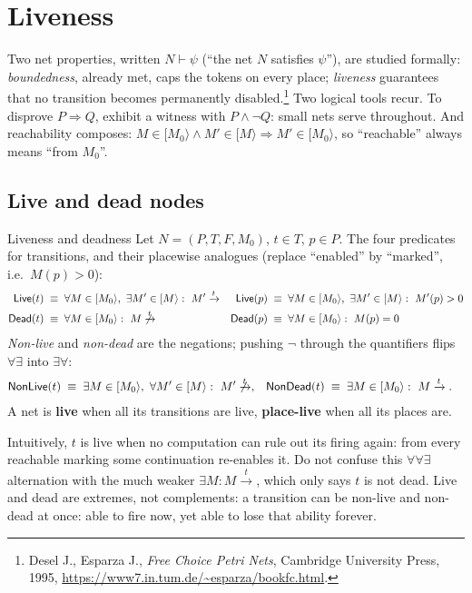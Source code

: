 \section{Liveness}

Two net properties, written $N \vdash \psi$ (``the net $N$ satisfies $\psi$''), are studied formally: \emph{boundedness}, already met, caps the tokens on every place; \emph{liveness} guarantees that no transition becomes permanently disabled.\footnote{Desel J., Esparza J., \emph{Free Choice Petri Nets}, Cambridge University Press, 1995, \url{https://www7.in.tum.de/~esparza/bookfc.html}.} Two logical tools recur. To disprove $P \Rightarrow Q$, exhibit a witness with $P \wedge \neg Q$: small nets serve throughout. And reachability composes: $M \in [M_0\rangle \wedge M' \in [M\rangle \Rightarrow M' \in [M_0\rangle$, so ``reachable'' always means ``from $M_0$''.

\subsection{Live and dead nodes}

\begin{definitionbox}{Liveness and deadness}
Let $N = (P, T, F, M_0)$, $t \in T$, $p \in P$. The four predicates for transitions, and their placewise analogues (replace ``enabled'' by ``marked'', i.e.\ $M(p) > 0$):
\begin{align*}
  \mathsf{Live}(t) &\;\equiv\; \forall M \in [M_0\rangle,\ \exists M' \in [M\rangle :\ M' \xrightarrow{t}
  & \mathsf{Live}(p) &\;\equiv\; \forall M \in [M_0\rangle,\ \exists M' \in [M\rangle :\ M'(p) > 0 \\
  \mathsf{Dead}(t) &\;\equiv\; \forall M \in [M_0\rangle :\ M \not\xrightarrow{t}
  & \mathsf{Dead}(p) &\;\equiv\; \forall M \in [M_0\rangle :\ M(p) = 0
\end{align*}
\emph{Non-live} and \emph{non-dead} are the negations; pushing $\neg$ through the quantifiers flips $\forall\exists$ into $\exists\forall$:
\begin{align*}
  \mathsf{NonLive}(t) &\;\equiv\; \exists M \in [M_0\rangle,\ \forall M' \in [M\rangle :\ M' \not\xrightarrow{t},
  & \mathsf{NonDead}(t) &\;\equiv\; \exists M \in [M_0\rangle :\ M \xrightarrow{t}.
\end{align*}
A net is \textbf{live} when all its transitions are live, \textbf{place-live} when all its places are.
\end{definitionbox}

Intuitively, $t$ is live when no computation can rule out its firing again: from every reachable marking some continuation re-enables it. Do not confuse this $\forall\forall\exists$ alternation with the much weaker $\exists M : M \xrightarrow{t}$, which only says $t$ is not dead. Live and dead are extremes, not complements: a transition can be non-live and non-dead at once: able to fire now, yet able to lose that ability forever.

